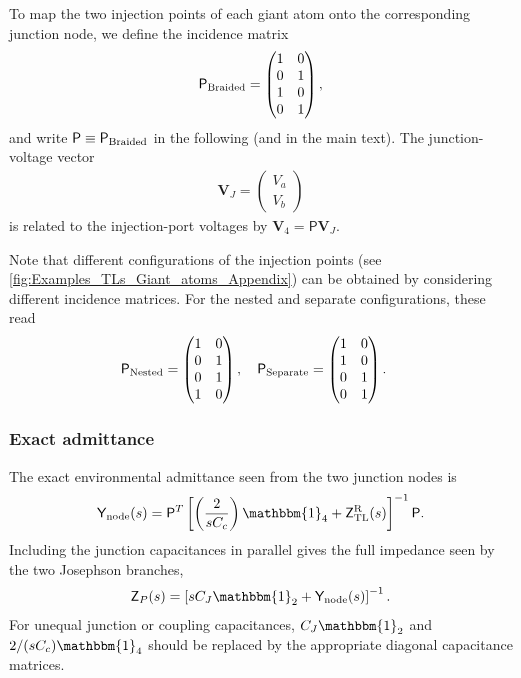 \documentclass[prx,aps,twocolumn,article]{revtex4-2}
\newcommand{\msf}[1]{\mathsf{#1}}
\newcommand{\mbf}[1]{\mathbf{#1}}
\newcommand{\msY}{\msf{Y}}
\newcommand{\msZ}{\msf{Z}}
\newcommand{\msZTL}{\msZ_{\mathrm{TL}}}
\newcommand{\msYnode}{\msY_{\rm node}}
\newcommand{\msP}{\msf{P}}
\newcommand{\msId}{\mathbbm{1}}
\begin{document}
To map the two injection points of each giant atom onto the corresponding
junction node, we define the incidence matrix
\begin{align}
    \msP_{\rm Braided}
    = \begin{pmatrix}
        1&0\\
        0&1\\
        1&0\\
        0&1
    \end{pmatrix},
    \label{Eq:BraidedIncidenceMatrix}
\end{align}
and write $\msP\equiv\msP_{\rm Braided}$ in the following (and in the main
text). The junction-voltage vector
\begin{align}
    \mbf V_J
    =
    \begin{pmatrix}
        V_a\\
        V_b
    \end{pmatrix}
\end{align}
is related to the injection-port voltages by
$\mbf V_4=\msP\mbf V_J$.

Note that different configurations of the injection points (see \cref{fig:Examples_TLs_Giant_atoms_Appendix}) can be obtained by considering different incidence matrices. For the nested and separate configurations, these read
\begin{align}
    \msP_{\rm Nested}
    &=
    \begin{pmatrix}
        1&0\\
        0&1\\
        0&1\\
        1&0
    \end{pmatrix},
    \quad
    \msP_{\rm Separate}
    =
    \begin{pmatrix}
        1&0\\
        1&0\\
        0&1\\
        0&1
    \end{pmatrix}.
\end{align}


\subsubsection{Exact admittance}
The exact environmental admittance seen from the two junction nodes is
\begin{align}
    \msYnode(s)
    =
    \msP^T
    \left[
        \left(\frac{2}{sC_c}\right)\msId_4
        +
        \msZTL^{\rm R}(s)
    \right]^{-1}
    \msP.
    \label{Eq:YenvBraidedExact}
\end{align}
Including the junction capacitances in parallel gives the full impedance
seen by the two Josephson branches,
\begin{align}
    \msZ_P(s)
    =
    \left[
        sC_J\msId_2
        +
        \msYnode(s)
    \right]^{-1}.
    \label{Eq:ZwidetildeBraidedExact}
\end{align}
For unequal junction or coupling capacitances, $C_J\msId_2$ and $2/(sC_c) \msId_4$ should be replaced by the appropriate diagonal capacitance matrices. 
\end{document}
